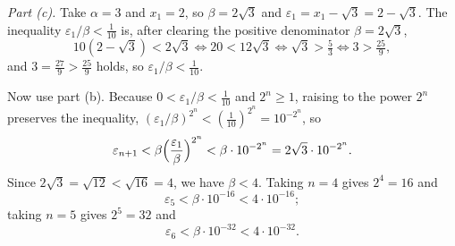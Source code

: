 \documentclass[main.tex]{subfiles}
\begin{document}
\begin{SolutionBlue}
\emph{Part (c).} Take $\alpha=3$ and $x_1=2$, so $\beta=2\sqrt3$ and
$\varepsilon_1=x_1-\sqrt3=2-\sqrt3$. The inequality $\varepsilon_1/\beta<\tfrac1{10}$ is, after
clearing the positive denominator $\beta=2\sqrt3$,
\[
10(2-\sqrt3)<2\sqrt3
\iff 20<12\sqrt3
\iff \sqrt3>\tfrac{5}{3}
\iff 3>\tfrac{25}{9},
\]
and $3=\tfrac{27}{9}>\tfrac{25}{9}$ holds, so $\varepsilon_1/\beta<\tfrac1{10}$.

Now use part (b). Because $0<\varepsilon_1/\beta<\tfrac1{10}$ and $2^{n}\ge 1$, raising to the power
$2^n$ preserves the inequality, $(\varepsilon_1/\beta)^{2^{n}}<(\tfrac1{10})^{2^{n}}=10^{-2^{n}}$, so
\[
\varepsilon_{n+1}<\beta\Bigl(\frac{\varepsilon_1}{\beta}\Bigr)^{2^{n}}<\beta\cdot 10^{-2^{n}}
=2\sqrt3\cdot 10^{-2^{n}}.
\]
Since $2\sqrt3=\sqrt{12}<\sqrt{16}=4$, we have $\beta<4$. Taking $n=4$ gives $2^{4}=16$ and
\[
\varepsilon_{5}<\beta\cdot 10^{-16}<4\cdot 10^{-16};
\]
taking $n=5$ gives $2^{5}=32$ and
\[
\varepsilon_{6}<\beta\cdot 10^{-32}<4\cdot 10^{-32}.
\]
\end{SolutionBlue}
\end{document}
